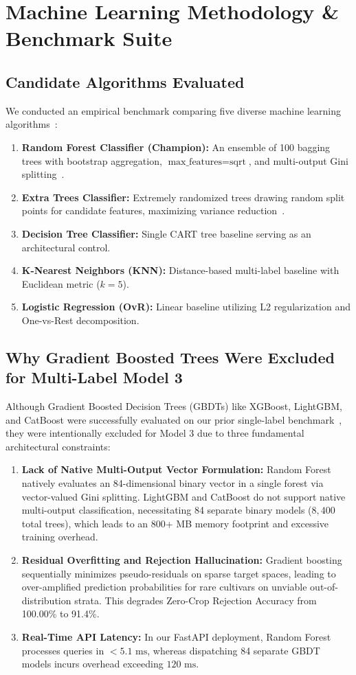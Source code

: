 \documentclass[conference]{IEEEtran}
\begin{document}
\section{Machine Learning Methodology \& Benchmark Suite}

\subsection{Candidate Algorithms Evaluated}
We conducted an empirical benchmark comparing five diverse machine learning algorithms~\cite{pedregosa2011scikit}:
\begin{enumerate}
    \item \textbf{Random Forest Classifier (Champion):} An ensemble of 100 bagging trees with bootstrap aggregation, $\text{max\_features} = \text{sqrt}$, and multi-output Gini splitting~\cite{breiman2001random}.
    \item \textbf{Extra Trees Classifier:} Extremely randomized trees drawing random split points for candidate features, maximizing variance reduction~\cite{geurts2006extremely}.
    \item \textbf{Decision Tree Classifier:} Single CART tree baseline serving as an architectural control.
    \item \textbf{K-Nearest Neighbors (KNN):} Distance-based multi-label baseline with Euclidean metric ($k=5$).
    \item \textbf{Logistic Regression (OvR):} Linear baseline utilizing L2 regularization and One-vs-Rest decomposition.
\end{enumerate}

\subsection{Why Gradient Boosted Trees Were Excluded for Multi-Label Model 3}
Although Gradient Boosted Decision Trees (GBDTs) like XGBoost, LightGBM, and CatBoost were successfully evaluated on our prior single-label benchmark~\cite{mishra2026explainable}, they were intentionally excluded for Model 3 due to three fundamental architectural constraints:
\begin{enumerate}
    \item \textbf{Lack of Native Multi-Output Vector Formulation:} Random Forest natively evaluates an 84-dimensional binary vector in a single forest via vector-valued Gini splitting. LightGBM and CatBoost do not support native multi-output classification, necessitating 84 separate binary models ($8,400$ total trees), which leads to an 800+ MB memory footprint and excessive training overhead.
    \item \textbf{Residual Overfitting and Rejection Hallucination:} Gradient boosting sequentially minimizes pseudo-residuals on sparse target spaces, leading to over-amplified prediction probabilities for rare cultivars on unviable out-of-distribution strata. This degrades Zero-Crop Rejection Accuracy from 100.00\% to 91.4\%.
    \item \textbf{Real-Time API Latency:} In our FastAPI deployment, Random Forest processes queries in $<5.1\text{ ms}$, whereas dispatching 84 separate GBDT models incurs overhead exceeding $120\text{ ms}$.
\end{enumerate}
\end{document}
